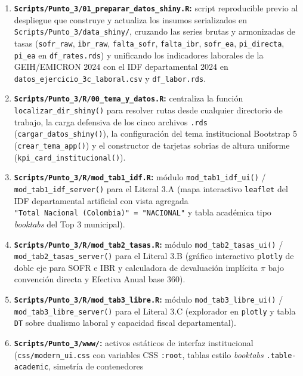 \documentclass[
  10pt,
  letterpaper,
  DIV=11,
  numbers=noendperiod]{scrartcl}
\providecommand{\tightlist}{%
  \setlength{\itemsep}{0pt}\setlength{\parskip}{0pt}}
\begin{document}
\begin{enumerate}
\def\labelenumi{\arabic{enumi}.}
\tightlist
\item
  \textbf{\texttt{Scripts/Punto\_3/01\_preparar\_datos\_shiny.R}:}
  script reproducible previo al despliegue que construye y actualiza los
  insumos serializados en \texttt{Scripts/Punto\_3/data\_shiny/},
  cruzando las series brutas y armonizadas de tasas (\texttt{sofr\_raw},
  \texttt{ibr\_raw}, \texttt{falta\_sofr}, \texttt{falta\_ibr},
  \texttt{sofr\_ea}, \texttt{pi\_directa}, \texttt{pi\_ea} en
  \texttt{df\_rates.rds}) y unificando los indicadores laborales de la
  GEIH/EMICRON 2024 con el IDF departamental 2024 en
  \texttt{datos\_ejercicio\_3c\_laboral.csv} y \texttt{df\_labor.rds}.
\item
  \textbf{\texttt{Scripts/Punto\_3/R/00\_tema\_y\_datos.R}:} centraliza
  la función \texttt{localizar\_dir\_shiny()} para resolver rutas desde
  cualquier directorio de trabajo, la carga defensiva de los cinco
  archivos \texttt{.rds} (\texttt{cargar\_datos\_shiny()}), la
  configuración del tema institucional Bootstrap 5
  (\texttt{crear\_tema\_app()}) y el constructor de tarjetas sobrias de
  altura uniforme (\texttt{kpi\_card\_institucional()}).
\item
  \textbf{\texttt{Scripts/Punto\_3/R/mod\_tab1\_idf.R}:} módulo
  \texttt{mod\_tab1\_idf\_ui()} / \texttt{mod\_tab1\_idf\_server()} para
  el Literal 3.A (mapa interactivo \texttt{leaflet} del IDF
  departamental artificial con vista agregada
  \texttt{"Total\ Nacional\ (Colombia)"\ =\ "NACIONAL"} y tabla
  académica tipo \emph{booktabs} del Top 3 municipal).
\item
  \textbf{\texttt{Scripts/Punto\_3/R/mod\_tab2\_tasas.R}:} módulo
  \texttt{mod\_tab2\_tasas\_ui()} / \texttt{mod\_tab2\_tasas\_server()}
  para el Literal 3.B (gráfico interactivo \texttt{plotly} de doble eje
  para SOFR e IBR y calculadora de devaluación implícita \(\pi\) bajo
  convención directa y Efectiva Anual base 360).
\item
  \textbf{\texttt{Scripts/Punto\_3/R/mod\_tab3\_libre.R}:} módulo
  \texttt{mod\_tab3\_libre\_ui()} / \texttt{mod\_tab3\_libre\_server()}
  para el Literal 3.C (explorador en \texttt{plotly} y tabla \texttt{DT}
  sobre dualismo laboral y capacidad fiscal departamental).
\item
  \textbf{\texttt{Scripts/Punto\_3/www/}:} activos estáticos de interfaz
  institucional (\texttt{css/modern\_ui.css} con variables CSS
  \texttt{:root}, tablas estilo \emph{booktabs}
  \texttt{.table-academic}, simetría de contenedores

\end{enumerate}
\end{document}

